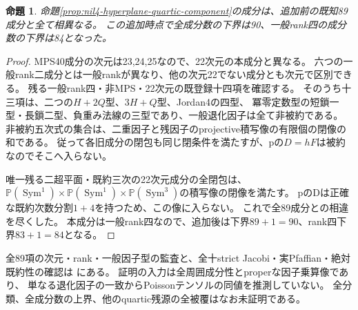 \documentclass[a4paper,11pt]{ltjsarticle}
\newtheorem{proposition}{命題}[section]
\theoremstyle{definition}
\begin{document}
\begin{proposition}\label{prop:nil4-quartic-distinctness}
命題\ref{prop:nil4-hyperplane-quartic-component}の成分は、追加前の既知89成分と全て相異なる。
この追加時点で全成分数の下界は90、一般rank四の成分数の下界は84となった。
\end{proposition}
\begin{proof}
MPS40成分の次元は23,24,25なので、22次元の本成分と異なる。
六つの一般rank二成分とは一般rankが異なり、他の次元22でない成分とも次元で区別できる。
残る一般rank四・非MPS・22次元の既登録十四項を確認する。
そのうち十三項は、二つの$H+2Q$型、$3H+Q$型、Jordan4の四型、
冪零定数型の短鎖一型・長鎖二型、負重み法線の三型であり、一般退化因子は全て非被約である。
非被約五次式の集合は、二重因子と残因子のprojective積写像の有限個の閉像の和である。
従って各旧成分の閉包も同じ閉条件を満たすが、pの$D=hF$は被約なのでそこへ入らない。

唯一残る二超平面・既約三次の22次元成分の全閉包は、
$\mathbb P(\operatorname{Sym}^1)\times\mathbb P(\operatorname{Sym}^1)
\times\mathbb P(\operatorname{Sym}^3)$の積写像の閉像を満たす。
pのDは正確な既約次数分割$1+4$を持つため、この像に入らない。
これで全89成分との相違を尽くした。
本成分は一般rank四なので、追加後は下界$89+1=90$、rank四下界$83+1=84$となる。
\end{proof}
全89項の次元・rank・一般因子型の監査と、全十strict Jacobi・実Pfaffian・絶対既約性の確認は
にある。
証明の入力は全周囲成分性とproperな因子乗算像であり、
単なる退化因子の一致からPoissonテンソルの同値を推測していない。
全分類、全成分数の上界、他のquartic残源の全被覆はなお未証明である。
\end{document}
